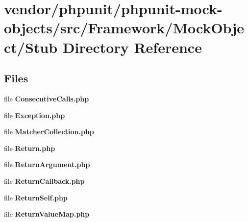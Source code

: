 \section{vendor/phpunit/phpunit-\/mock-\/objects/src/\+Framework/\+Mock\+Object/\+Stub Directory Reference}
\label{dir_7724231f408b99fa0835c0bc65098c96}
\subsection*{Files}
\begin{DoxyCompactItemize}
\item 
file {\bf Consecutive\+Calls.\+php}
\item 
file {\bf Exception.\+php}
\item 
file {\bf Matcher\+Collection.\+php}
\item 
file {\bf Return.\+php}
\item 
file {\bf Return\+Argument.\+php}
\item 
file {\bf Return\+Callback.\+php}
\item 
file {\bf Return\+Self.\+php}
\item 
file {\bf Return\+Value\+Map.\+php}
\end{DoxyCompactItemize}
